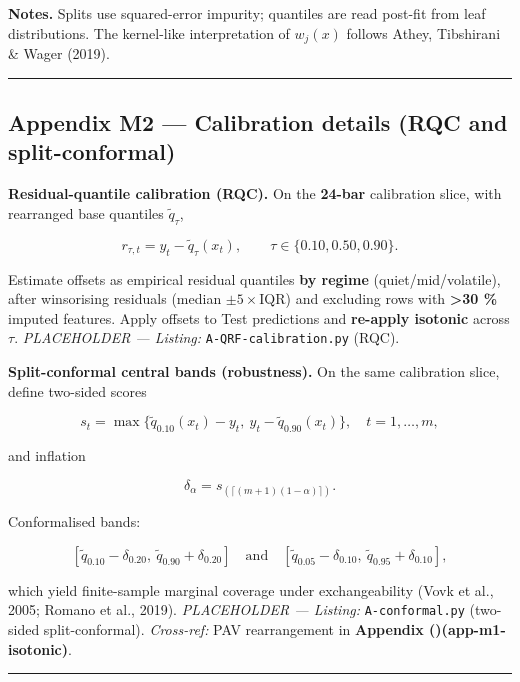 \documentclass[
  a4paper,
  DIV=11,
  numbers=noendperiod]{scrreprt}
\begin{document}
\textbf{Notes.} Splits use squared-error impurity; quantiles are read
post-fit from leaf distributions. The kernel-like interpretation of
\(w_j(x)\) follows Athey, Tibshirani \& Wager (2019).

\begin{center}\rule{0.5\linewidth}{0.5pt}\end{center}

\subsection{Appendix M2 --- Calibration details (RQC and
split-conformal)}\label{app-m2-conformal}

\textbf{Residual-quantile calibration (RQC).} On the \textbf{24-bar}
calibration slice, with rearranged base quantiles
\(\widetilde q_{\tau}\),

\[
\label{eq-rqc-resid}
r_{\tau,t}=y_t-\widetilde q_{\tau}(x_t),\qquad \tau\in\{0.10,0.50,0.90\}.
\]

Estimate offsets as empirical residual quantiles \textbf{by regime}
(quiet/mid/volatile), after winsorising residuals (median
\(\pm 5\times\)IQR) and excluding rows with \textbf{\textgreater30 \%}
imputed features. Apply offsets to Test predictions and \textbf{re-apply
isotonic} across \(\tau\). \emph{PLACEHOLDER --- Listing:}
\texttt{A-QRF-calibration.py} (RQC).

\textbf{Split-conformal central bands (robustness).} On the same
calibration slice, define two-sided scores

\[
\label{eq-conformal-score-qrf}
s_t=\max\{\widetilde q_{0.10}(x_t)-y_t,\ y_t-\widetilde q_{0.90}(x_t)\},\quad t=1,\ldots,m,
\]

and inflation

\[
\label{eq-conformal-delta-qrf}
\delta_\alpha=s_{(\lceil (m+1)(1-\alpha)\rceil)}.
\]

Conformalised bands:

\[
\label{eq-conformal-band-qrf}
[\widetilde q_{0.10}-\delta_{0.20},\ \widetilde q_{0.90}+\delta_{0.20}]
\quad\text{and}\quad
[\widetilde q_{0.05}-\delta_{0.10},\ \widetilde q_{0.95}+\delta_{0.10}],
\]

which yield finite-sample marginal coverage under exchangeability (Vovk
et al., 2005; Romano et al., 2019). \emph{PLACEHOLDER --- Listing:}
\texttt{A-conformal.py} (two-sided split-conformal). \emph{Cross-ref:}
PAV rearrangement in \textbf{Appendix
()(app-m1-isotonic)}.

\begin{center}\rule{0.5\linewidth}{0.5pt}\end{center}
\end{document}
